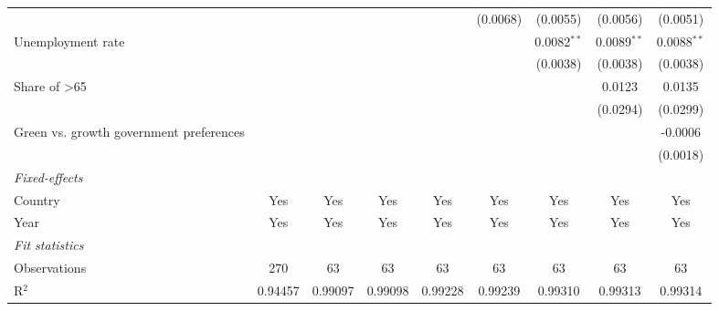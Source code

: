 \begin{table}[htbp]
\begin{tabular}{lcccccccc}
                                                                                      &          &          &          &              & (0.0068)      & (0.0055)      & (0.0056)      & (0.0051)\\   
      Unemployment rate                                                               &          &          &          &              &               & 0.0082$^{**}$ & 0.0089$^{**}$ & 0.0088$^{**}$\\   
                                                                                      &          &          &          &              &               & (0.0038)      & (0.0038)      & (0.0038)\\   
      Share of >65                                                                    &          &          &          &              &               &               & 0.0123        & 0.0135\\   
                                                                                      &          &          &          &              &               &               & (0.0294)      & (0.0299)\\   
      Green vs. growth government preferences                                         &          &          &          &              &               &               &               & -0.0006\\   
                                                                                      &          &          &          &              &               &               &               & (0.0018)\\   
      \midrule
      \emph{Fixed-effects}\\
      Country                                                                         & Yes      & Yes      & Yes      & Yes          & Yes           & Yes           & Yes           & Yes\\  
      Year                                                                            & Yes      & Yes      & Yes      & Yes          & Yes           & Yes           & Yes           & Yes\\  
      \midrule
      \emph{Fit statistics}\\
      Observations                                                                    & 270      & 63       & 63       & 63           & 63            & 63            & 63            & 63\\  
      R$^2$                                                                           & 0.94457  & 0.99097  & 0.99098  & 0.99228      & 0.99239       & 0.99310       & 0.99313       & 0.99314\\  

\end{tabular}
\end{table}
